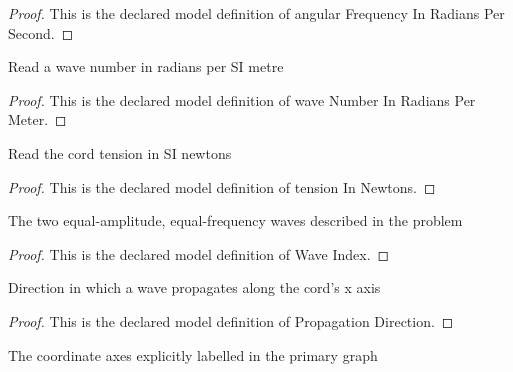 \begin{proof}
  This is the declared model definition of angular Frequency In Radians Per Second.
\end{proof}
\begin{definition}
  \label{def:physics:phyx-mini-0303:phyxminiproblems-problemphyxmini0303-wavenumberinradianspermeter}
  Read a wave number in radians per SI metre
\end{definition}
\begin{proof}
  This is the declared model definition of wave Number In Radians Per Meter.
\end{proof}
\begin{definition}
  \label{def:physics:phyx-mini-0303:phyxminiproblems-problemphyxmini0303-tensioninnewtons}
  Read the cord tension in SI newtons
\end{definition}
\begin{proof}
  This is the declared model definition of tension In Newtons.
\end{proof}
\begin{definition}
  \label{def:physics:phyx-mini-0303:phyxminiproblems-problemphyxmini0303-waveindex}
  The two equal-amplitude, equal-frequency waves described in the problem
\end{definition}
\begin{proof}
  This is the declared model definition of Wave Index.
\end{proof}
\begin{definition}
  \label{def:physics:phyx-mini-0303:phyxminiproblems-problemphyxmini0303-propagationdirection}
  Direction in which a wave propagates along the cord's x axis
\end{definition}
\begin{proof}
  This is the declared model definition of Propagation Direction.
\end{proof}
\begin{definition}
  \label{def:physics:phyx-mini-0303:phyxminiproblems-problemphyxmini0303-graphaxis}
  The coordinate axes explicitly labelled in the primary graph
\end{definition}
